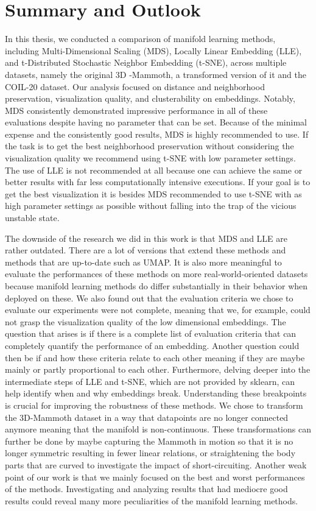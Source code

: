\chapter{Summary and Outlook}

In this thesis, we conducted a comparison of manifold learning methods, including Multi-Dimensional Scaling (MDS), Locally Linear Embedding (LLE), and t-Distributed Stochastic Neighbor Embedding (t-SNE), across multiple datasets, namely the original 3D -Mammoth, a transformed version of it and the COIL-20 dataset. Our analysis focused on distance and neighborhood preservation, visualization quality, and clusterability on embeddings. Notably, MDS consistently demonstrated impressive performance in all of these evaluations despite having no parameter that can be set. Because of the minimal expense and the consistently good results, MDS is highly recommended to use. If the task is to get the best neighborhood preservation without considering the visualization quality we recommend using t-SNE with low parameter settings. The use of LLE is not recommended at all because one can achieve the same or better results with far less computationally intensive executions. If your goal is to get the best visualization it is besides MDS recommended to use t-SNE with as high parameter settings as possible without falling into the trap of the vicious unstable state.

The downside of the research we did in this work is that MDS and LLE are rather outdated. There are a lot of versions that extend these methods and methods that are up-to-date such as UMAP. It is also more meaningful to evaluate the performances of these methods on more real-world-oriented datasets because manifold learning methods do differ substantially in their behavior when deployed on these. \cite{Zubova18} We also found out that the evaluation criteria we chose to evaluate our experiments were not complete, meaning that we, for example, could not grasp the visualization quality of the low dimensional embeddings. The question that arises is if there is a complete list of evaluation criteria that can completely quantify the performance of an embedding. Another question could then be if and how these criteria relate to each other meaning if they are maybe mainly or partly proportional to each other. Furthermore, delving deeper into the intermediate steps of LLE and t-SNE, which are not provided by sklearn, can help identify when and why embeddings break. Understanding these breakpoints is crucial for improving the robustness of these methods. We chose to transform the 3D-Mammoth dataset in a way that datapoints are no longer connected anymore meaning that the manifold is non-continuous. These transformations can further be done by maybe capturing the Mammoth in motion so that it is no longer symmetric resulting in fewer linear relations, or straightening the body parts that are curved to investigate the impact of short-circuiting. Another weak point of our work is that we mainly focused on the best and worst performances of the methods. Investigating and analyzing results that had mediocre good results could reveal many more peculiarities of the manifold learning methods.

